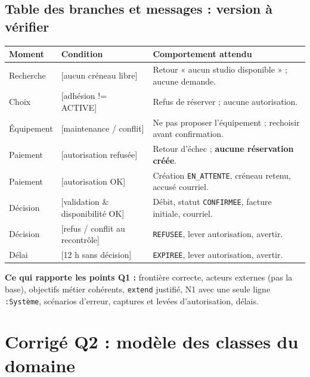 \documentclass[10pt,a4paper]{article}
\begin{document}
\subsection{Table des branches et messages : version à vérifier}
\begin{longtable}{@{}p{22mm}p{42mm}p{86mm}@{}}
\toprule
Moment & Condition & Comportement attendu \\
\midrule\endhead
Recherche & [aucun créneau libre] & Retour « aucun studio disponible » ; aucune demande. \\
Choix & [adhésion != ACTIVE] & Refus de réserver ; aucune autorisation. \\
Équipement & [maintenance / conflit] & Ne pas proposer l'équipement ; rechoisir avant confirmation. \\
Paiement & [autorisation refusée] & Retour d'échec ; \textbf{aucune réservation créée}. \\
Paiement & [autorisation OK] & Création \texttt{EN\_ATTENTE}, créneau retenu, accusé courriel. \\
Décision & [validation \& disponibilité OK] & Débit, statut \texttt{CONFIRMEE}, facture initiale, courriel. \\
Décision & [refus / conflit au recontrôle] & \texttt{REFUSEE}, lever autorisation, avertir. \\
Délai & [12 h sans décision] & \texttt{EXPIREE}, lever autorisation, avertir. \\
\bottomrule
\end{longtable}
\begin{answerbox}
\textbf{Ce qui rapporte les points Q1 :} frontière correcte, acteurs externes (pas la base), objectifs métier cohérents, \texttt{extend} justifié, N1 avec une seule ligne \texttt{:Système}, scénarios d'erreur, captures et levées d'autorisation, délais.
\end{answerbox}

\section{Corrigé Q2 : modèle des classes du domaine}
\end{document}

